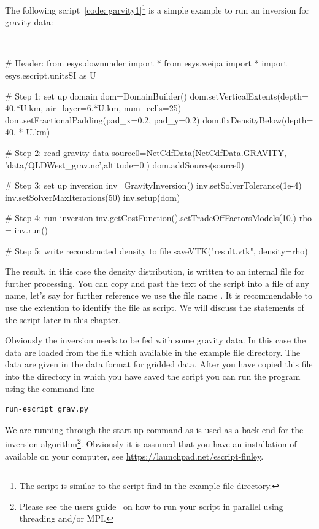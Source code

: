 The following script~\ref{code: garvity1}\footnote{The script is similar to the  script
find in the \escript example file directory.} is a simple example to run an inversion for gravity data: 
\begin{pyc}
\
\begin{verbatim*}
# Header:
from esys.downunder import *
from esys.weipa import *
import esys.escript.unitsSI as U

# Step 1: set up domain
dom=DomainBuilder()
dom.setVerticalExtents(depth= 40.*U.km, air_layer=6.*U.km, num_cells=25)
dom.setFractionalPadding(pad_x=0.2, pad_y=0.2)
dom.fixDensityBelow(depth= 40. * U.km)

# Step 2: read gravity data
source0=NetCdfData(NetCdfData.GRAVITY, 'data/QLDWest_grav.nc',altitude=0.)
dom.addSource(source0)

# Step 3: set up inversion
inv=GravityInversion()
inv.setSolverTolerance(1e-4)
inv.setSolverMaxIterations(50)
inv.setup(dom)

# Step 4: run inversion 
inv.getCostFunction().setTradeOffFactorsModels(10.) 
rho = inv.run()

# Step 5: write reconstructed density to file
saveVTK("result.vtk", density=rho)
\end{verbatim*}\label{code: garvity1}
\end{pyc}
The result, in this
case the density distribution, is written to an internal file for further processing. You can copy and past the text of the 
script into a file of any name, let's say for further reference we use the file name \file{grav.py}. It is recommendable
to use the extention \file{py} to identify the file as \python script. We will discuss the statements
of the script later in this chapter. 

Obviously the inversion needs to be fed with some gravity data. In this case 
the data are loaded from the file \examplefile{data/QLDWest_grav.nc} which available in the \escript example file directory. The data are given 
in the \netcdf data format for gridded data. After you have copied this file into the directory in which you have
saved the script \file{grav.py} you can run the program using the command line 
\begin{verbatim}
run-escript grav.py
\end{verbatim}
We are running  through the \escript start-up command as \escript is used as a back end for the inversion 
algorithm\footnote{Please see the \escript users guide~\cite{ESCRIPT} on how to run 
your script in parallel using threading and/or MPI.}. Obviously it is  assumed that you have an
installation of \escript available on your computer, see \url{https://launchpad.net/escript-finley}.

